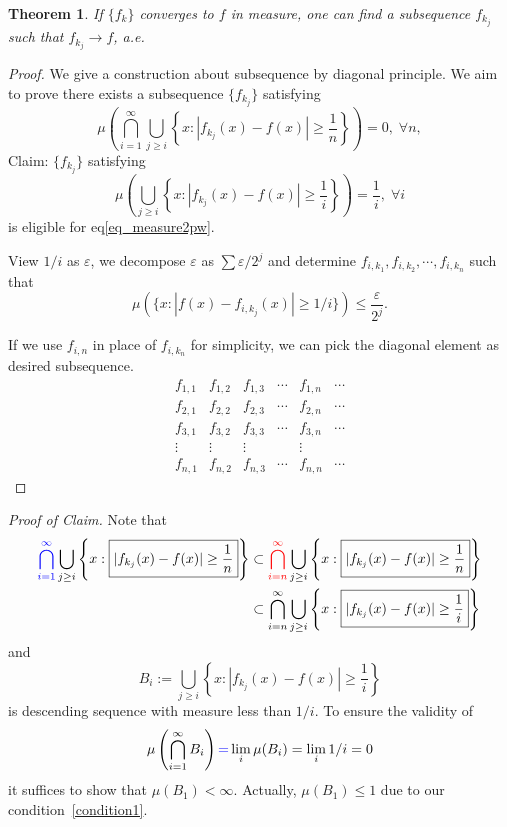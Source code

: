 \documentclass[dvipsnames]{article}
\numberwithin{equation}{section}
\newtheorem{Theorem}{Theorem}[section] %
\begin{document}
\begin{Theorem}
    If $\{f_{k}\}$ converges to $f$ in measure, one can find a subsequence $f_{k_{j}}$ such that $f_{k_j}\to f$, a.e.
\end{Theorem}

\begin{proof} We give a construction about subsequence by diagonal principle. We aim to prove there exists a subsequence $\{f_{k_j}\}$ satisfying
\begin{equation}
\label{eq_measure2pw}
    \mu\left(\bigcap _{i= 1}^{\infty} \bigcup_{j\geq i} \left\{x: \boxed{|f_{k_j}(x)-f(x)|\geq \frac{1}{n}}\right\}\right) = 0,\;\forall n,
\end{equation}
Claim: $\{f_{k_j}\}$ satisfying
$$
\mu\left(\bigcup_{j\geq i} \left\{x: \boxed{|f_{k_j}(x)-f(x)|\geq \frac{1}{i}}\right\}\right) = \frac{1}{i}, \;\forall i
$$
is eligible for eq\eqref{eq_measure2pw}.

View $1/i$ as $\varepsilon$, we decompose $\varepsilon$ as $\sum \varepsilon/2^{j}$ and determine $f_{i,k_1}, f_{i,k_2},\cdots, f_{i,k_n}$ such that 
\begin{equation}
\label{condition1}
    \mu\left(\{x: |f(x)-f_{i,k_j}(x)|\geq 1/i\}\right) \leq \frac{\varepsilon}{2^j}.
\end{equation}


If we use $f_{i,n}$ in place of $f_{i,k_n}$ for simplicity, we can pick the diagonal element as desired subsequence.
$$
\begin{array}{cccccc}
    \boxed{f_{1,1}} & f_{1,2} & f_{1,3} & \cdots & f_{1,n} & \cdots\\
    f_{2,1} & \boxed{f_{2,2}} & f_{2,3} & \cdots & f_{2,n} & \cdots\\
    f_{3,1} & f_{3,2} & \boxed{f_{3,3}} & \cdots & f_{3,n} & \cdots\\
    \vdots  & \vdots  & \vdots  &    &   \vdots&\\
    f_{n,1} & f_{n,2} & f_{n,3} & \cdots & \boxed{f_{n,n}} & \cdots
\end{array}
$$
\end{proof}

\textit{Proof of Claim.} Note that 
$$
\begin{aligned}
    {\color{blue}\bigcap _{i= 1}^{\infty}} \bigcup_{j\geq i} \left\{x: \boxed{|f_{k_j}(x)-f(x)|\geq \frac{1}{n}}\right\} 
    &\subset 
    {\color{red}\bigcap _{i= n}^{\infty}} \bigcup_{j\geq i} \left\{x: \boxed{|f_{k_j}(x)-f(x)|\geq \frac{1}{n}}\right\}
    \\
    &\subset 
    \bigcap _{i= n}^{\infty} \bigcup_{j\geq i} \left\{x: \boxed{|f_{k_j}(x)-f(x)|\geq \frac{1}{i}}\right\}
\end{aligned}
$$
and 
$$
B_{i}:= \bigcup_{j\geq i} \left\{x: \boxed{|f_{k_j}(x)-f(x)|\geq \frac{1}{i}}\right\}
$$
is descending sequence with measure less than $1/i$. To ensure the validity of 
$$
\mu\left(\bigcap_{i=1}^{\infty}B_{i}\right) {\color{blue}=} \lim_{i}\mu(B_{i}) =\lim_{i} 1/i=0
$$
it suffices to show that $\mu(B_1)<\infty$. Actually, $\mu(B_1)\leq 1$ due to our condition~\eqref{condition1}.
\end{document}
